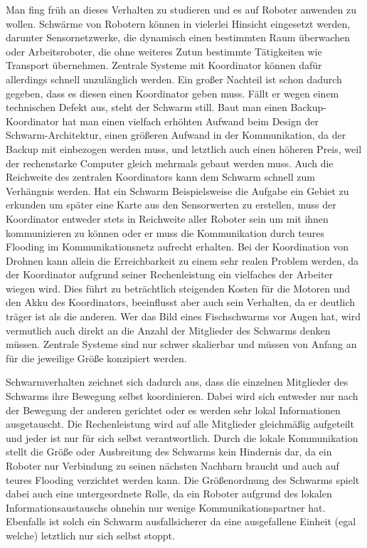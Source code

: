 Man fing früh an dieses Verhalten zu studieren und es auf Roboter anwenden zu wollen. Schwärme von Robotern können in vielerlei Hinsicht eingesetzt werden, darunter Sensornetzwerke, die dynamisch einen bestimmten Raum überwachen oder Arbeitsroboter, die ohne weiteres Zutun bestimmte Tätigkeiten wie Transport übernehmen.
Zentrale Systeme mit Koordinator können dafür allerdings schnell unzulänglich werden. Ein großer Nachteil ist schon dadurch gegeben, dass es diesen einen Koordinator geben muss. Fällt er wegen einem technischen Defekt aus, steht der Schwarm still. Baut man einen Backup-Koordinator hat man einen vielfach erhöhten Aufwand beim Design der Schwarm-Architektur, einen größeren Aufwand in der Kommunikation, da der Backup mit einbezogen werden muss, und letztlich auch einen höheren Preis, weil der rechenstarke Computer gleich mehrmals gebaut werden muss.
Auch die Reichweite des zentralen Koordinators kann dem Schwarm schnell zum Verhängnis werden. Hat ein Schwarm Beispielsweise die Aufgabe ein Gebiet zu erkunden um später eine Karte aus den Sensorwerten zu erstellen, muss der Koordinator entweder stets in Reichweite aller Roboter sein um mit ihnen kommunizieren zu können oder er muss die Kommunikation durch teures Flooding im Kommunikationsnetz aufrecht erhalten. Bei der Koordination von Drohnen kann allein die Erreichbarkeit zu einem sehr realen Problem werden, da der Koordinator aufgrund seiner Rechenleistung ein vielfaches der Arbeiter wiegen wird. Dies führt zu beträchtlich steigenden Kosten für die Motoren und den Akku des Koordinators, beeinflusst aber auch sein Verhalten, da er deutlich träger ist als die anderen.
Wer das Bild eines Fischschwarms vor Augen hat, wird vermutlich auch direkt an die Anzahl der Mitglieder des Schwarms denken müssen. Zentrale Systeme sind nur schwer skalierbar und müssen von Anfang an für die jeweilige Größe konzipiert werden.

Schwarmverhalten zeichnet sich dadurch aus, dass die einzelnen Mitglieder des Schwarms ihre Bewegung selbst koordinieren. Dabei wird sich entweder nur nach der Bewegung der anderen gerichtet oder es werden sehr lokal Informationen ausgetauscht. Die Rechenleistung wird auf alle Mitglieder gleichmäßig aufgeteilt und jeder ist nur für sich selbst verantwortlich. Durch die lokale Kommunikation stellt die Größe oder Ausbreitung des Schwarms kein Hindernis dar, da ein Roboter nur Verbindung zu seinen nächsten Nachbarn braucht und auch auf teures Flooding verzichtet werden kann. Die Größenordnung des Schwarms spielt dabei auch eine untergeordnete Rolle, da ein Roboter aufgrund des lokalen Informationsaustauschs ohnehin nur wenige Kommunikationspartner hat. Ebenfalls ist solch ein Schwarm ausfallsicherer da eine ausgefallene Einheit (egal welche) letztlich nur sich selbst stoppt. 

